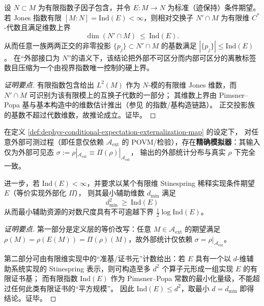 \begin{proposition}\label{prop:dephys-relative-commutant-dimension-index-cap}
设 \(N\subset M\) 为有限指数子因子包含，并令 \(E:M\to N\) 为标准（迹保持）条件期望。
若 Jones 指数有限 \([M:N]=\mathrm{Ind}(E)<\infty\)，则相对交换子 \(N'\cap M\) 为有限维 \(C^\ast\)-代数且满足维数上界
\begin{equation}\label{eq:dephys-relative-commutant-dimension-bound}
\boxed{\;\dim(N'\cap M)\ \le\ \mathrm{Ind}(E).\;}
\end{equation}
从而任意一族两两正交的非零投影 \(\{p_j\}\subset N'\cap M\) 的基数满足
\(
|\{p_j\}|\le \mathrm{Ind}(E)
\)。
在“外部接口为 \(N\)”的语义下，该结论把外部不可区分而内部可区分的离散标签数目压缩为一个由视界指数唯一控制的硬上界。
\end{proposition}

\begin{proof}[证明要点]
有限指数包含给出 \(L^2(M)\) 作为 \(N\)-模的有限维 Jones 维数，而 \(N'\cap M\) 可识别为该有限模上的互换子代数的一部分；
其维数上界由 Pimsner--Popa 基与基本构造中的维数估计推出（参见 \cite{PimsnerPopa1986EntropyIndexSubfactors} 的指数/基构造链路）。
正交投影族的基数不超过代数维数，故推论成立。证毕。
\end{proof}



\begin{proposition}\label{prop:dephys-operator-zk-simulation-index-lower-bound}
在定义 \ref{def:dephys-conditional-expectation-externalization-map} 的设定下，
对任意外部可测过程（即任意仅依赖 \(\mathcal{A}_{\mathrm{ext}}\) 的 POVM/检验），存在\textbf{精确模拟器}：其输入仅为外部可见态
\(
\sigma:=\rho|_{\mathcal{A}_{\mathrm{ext}}}\equiv \Pi(\rho)|_{\mathcal{A}_{\mathrm{ext}}}
\)，
输出的外部统计分布与真实 \(\rho\) 下完全一致。
\par
进一步，若 \(\mathrm{Ind}(E)<\infty\)，并要求以某个有限维 Stinespring 稀释实现条件期望 \(E\)（等价实现外部化 \(\Pi\)），
则其最小辅助维数 \(d_{\min}\) 满足
\[
\boxed{\;d_{\min}^2\ \ge\ \mathrm{Ind}(E)\;}
\]
从而最小辅助资源的对数尺度具有不可逾越下界 \(\tfrac12\log\mathrm{Ind}(E)\)。
\end{proposition}
\begin{proof}[证明要点]
第一部分是定义层的等价改写：任意 \(M\in\mathcal{A}_{\mathrm{ext}}\) 的期望满足
\(
\rho(M)=\rho(E(M))=\Pi(\rho)(M)
\)，故外部统计仅依赖 \(\sigma=\rho|_{\mathcal{A}_{\mathrm{ext}}}\)。
\par
第二部分可由有限维实现中的“准基/证书元”计数给出：若 \(E\) 具有一个以 \(d\)-维辅助系统实现的 Stinespring 表示，则可构造至多 \(d^2\) 个算子元形成一组实现 \(E\) 的有限证书基；
而有限指数 \(\mathrm{Ind}(E)\) 作为 Pimsner--Popa 常数的最小化量级，不能超过任何此类有限证书的“平方规模”。
因此 \(\mathrm{Ind}(E)\le d^2\)，取最小 \(d=d_{\min}\) 即得结论。证毕。
\end{proof}

